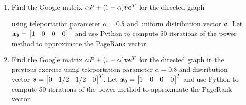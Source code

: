 \begin{enumerate}[leftmargin=*]
\item Find the Google matrix $\alpha P + (1 - \alpha) \boldsymbol{v} \boldsymbol{e}^T$ for the directed graph
\begin{center}
\end{center}
using teleportation parameter $\alpha=0.5$ and uniform distribution vector $\boldsymbol{v}$. Let $\boldsymbol{x}_0 = \begin{bmatrix} 1 & 0 & 0 & 0 \end{bmatrix}^T$ and use Python to compute 50 iterations of the power method to approximate the PageRank vector.
\item Find the Google matrix $\alpha P + (1 - \alpha) \boldsymbol{v} \boldsymbol{e}^T$ for the directed graph in the previous exercise using teleportation parameter $\alpha=0.8$ and distribution vector $\boldsymbol{v} =  \begin{bmatrix} 0 & 1/2 & 1/2 & 0 \end{bmatrix}^T$. Let $\boldsymbol{x}_0 = \begin{bmatrix} 1 & 0 & 0 & 0 \end{bmatrix}^T$ and use Python to compute 50 iterations of the power method to approximate the PageRank vector.
\end{enumerate}